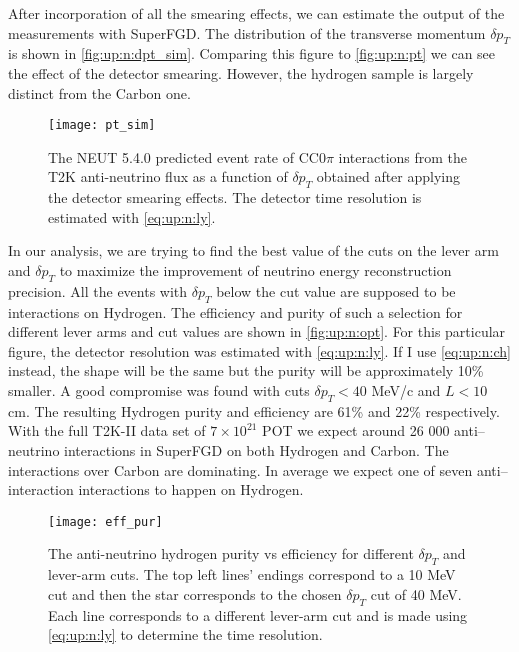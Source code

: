 \documentclass[main.tex]{subfiles}
\begin{document}
After incorporation of all the smearing effects, we can estimate the output of the measurements with SuperFGD. The distribution of the transverse momentum $\delta p_T$ is shown in \autoref{fig:up:n:dpt_sim}. Comparing this figure to \autoref{fig:up:n:pt} we can see the effect of the detector smearing. However, the hydrogen sample is largely distinct from the Carbon one.

\begin{figure}[!ht]
  \centering
  \texttt{[image: pt\_sim]}
  \caption{The NEUT 5.4.0 predicted event rate of CC0$\pi$ interactions from the T2K anti-neutrino flux as a function of $\delta p_T$ obtained after applying the detector smearing effects. The detector time resolution is estimated with \autoref{eq:up:n:ly}.}
  \label{fig:up:n:dpt_sim}
\end{figure}

In our analysis, we are trying to find the best value of the cuts on the lever arm and $\delta p_T$ to maximize the improvement of neutrino energy reconstruction precision. All the events with $\delta p_T$ below the cut value are supposed to be interactions on Hydrogen. The efficiency and purity of such a selection for different lever arms and cut values are shown in \autoref{fig:up:n:opt}. For this particular figure, the detector resolution was estimated with \autoref{eq:up:n:ly}. If I use \autoref{eq:up:n:ch} instead, the shape will be the same but the purity will be approximately 10\% smaller. A good compromise was found with cuts $\delta p_T < 40$ MeV/c and $L < 10$ cm. The resulting Hydrogen purity and efficiency are 61\% and 22\% respectively. With the full T2K-II data set of $7\times 10^{21}$ POT we expect around 26 000 anti--neutrino interactions in SuperFGD on both Hydrogen and Carbon. The interactions over Carbon are dominating. In average we expect one of seven anti--interaction interactions to happen on Hydrogen.

\begin{figure}[!ht]
  \centering
  \texttt{[image: eff\_pur]}
  \caption{The anti-neutrino hydrogen purity vs efficiency for different $\delta p_T$ and lever-arm cuts. The top left lines' endings correspond to a 10 MeV cut and then the star corresponds to the chosen $\delta p_T$ cut of 40 MeV. Each line corresponds to a different lever-arm cut and is made using \autoref{eq:up:n:ly} to determine the time resolution.}
  \label{fig:up:n:opt}
\end{figure}
\end{document}
